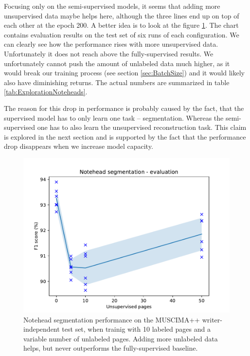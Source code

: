 Focusing only on the semi-supervised models, it seems that adding more unsupervised data maybe helps here, although the three lines end up on top of each other at the epoch 200. A better idea is to look at the figure \ref{fig:ExplorationNoteheadsEvaluation}. The chart contains evaluation results on the test set of six runs of each configuration. We can clearly see how the performance rises with more unsupervised data. Unfortunately it does not reach above the fully-supervised results. We unfortunately cannot push the amount of unlabeled data much higher, as it would break our training process (see section \ref{sec:BatchSize}) and it would likely also have diminishing returns. The actual numbers are summarized in table \ref{tab:ExplorationNoteheads}.

The reason for this drop in performance is probably caused by the fact, that the supervised model has to only learn one task -- segmentation. Whereas the semi-supervised one has to also learn the unsupervised reconstruction task. This claim is explored in the next section and is supported by the fact that the performance drop disappears when we increase model capacity.

\begin{figure}[ht]
    \centering
    \includegraphics[width=140mm]{../../figures/01-exploration-noteheads/noteheads-evaluation.pdf}
    \caption{Notehead segmentation performance on the MUSCIMA++ writer-independent test set, when trainig with 10 labeled pages and a variable number of unlabeled pages. Adding more unlabeled data helps, but never outperforms the fully-supervised baseline.}
    \label{fig:ExplorationNoteheadsEvaluation}
\end{figure}

